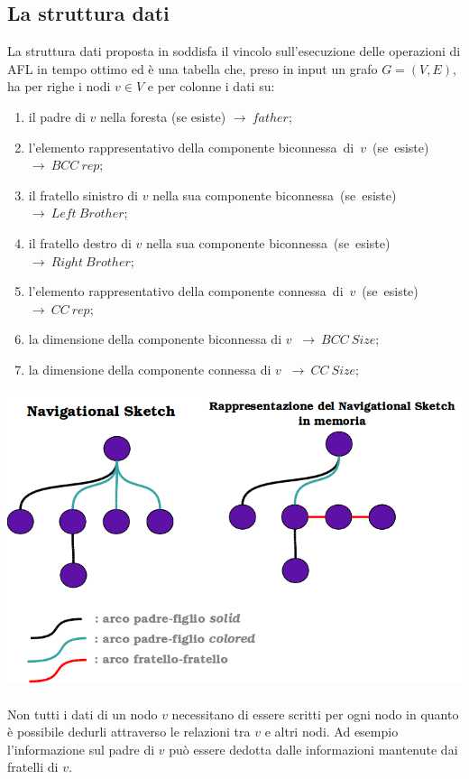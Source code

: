 \documentclass[a4paper,11pt]{report}
\begin{document}
\subsection{La struttura dati}
La struttura dati proposta in \cite{AFLNetworks:articolo} soddisfa il vincolo sull'esecuzione delle operazioni di AFL in tempo ottimo ed è
una tabella che, preso in input un grafo $G=(V,E)$, 
ha per righe i nodi $v \in V$ e per colonne i dati su:
\begin{enumerate}
 \item il padre di $v$ nella foresta (se esiste) $\rightarrow\ father$;
 \item l'elemento rappresentativo della componente \mbox{biconnessa di $v$ (se esiste) $\rightarrow\ BCC\ rep$;}
 \item il fratello sinistro di $v$ nella sua componente \mbox{biconnessa (se esiste) $\rightarrow\ Left\ Brother$;}
 \item il fratello destro di $v$ nella sua componente \mbox{biconnessa (se esiste) $\rightarrow\ Right\ Brother$;} 
 \item l'elemento rappresentativo della componente \mbox{connessa di $v$ (se esiste) $\rightarrow\ CC\ rep$;}
 \item la dimensione della componente biconnessa di $v$ $\ \rightarrow\ BCC\ Size$;
 \item la dimensione della componente connessa di $v$ $\ \rightarrow\ CC\ Size$;
\end{enumerate}
\paragraph{}
\centerline{\includegraphics[width=150mm]{images/ns_in_memoria.png}} 
\paragraph{}
Non tutti i dati di un nodo $v$ necessitano di essere scritti per ogni nodo in quanto è possibile dedurli attraverso
le relazioni tra $v$ e altri nodi. Ad esempio l'informazione sul padre di $v$ può essere dedotta dalle informazioni mantenute dai fratelli
di $v$.
\end{document}
